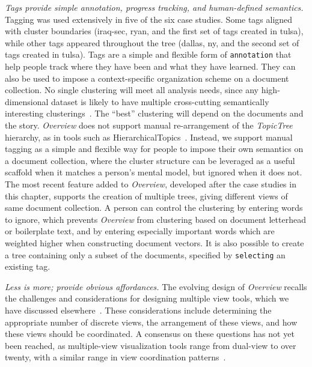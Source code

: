 {\it Tags provide simple annotation, progress tracking, and human-defined semantics.}
Tagging was used extensively in five of the six case studies. 
Some tags aligned with cluster boundaries ({\sc iraq-sec}, {\sc ryan}, and the first set of tags created in {\sc tulsa}), while other tags appeared throughout the tree ({\sc dallas}, {\sc ny}, and the second set of tags created in {\sc tulsa}).
Tags are a simple and flexible form of {\tt annotation} that help people track where they have been and what they have learned. 
They can also be used to impose a context-specific organization scheme on a document collection.
No single clustering will meet all analysis needs, since any high-dimensional dataset is likely to have multiple cross-cutting semantically interesting clusterings~\cite{Grimmer2011}. 
The ``best'' clustering will depend on the documents and the story.
{\it Overview} does not support manual re-arrangement of the {\it TopicTree} hierarchy, as in tools such as HierarchicalTopics~\cite{Dou2013}.
Instead, we support manual tagging as a simple and flexible way for people to impose their own semantics on a document collection, where the cluster structure can be leveraged as a useful scaffold when it matches a person's mental model, but ignored when it does not.
The most recent feature added to {\it Overview}, developed after the case studies in this chapter, supports the creation of multiple trees, giving different views of same document collection. 
A person can control the clustering by entering words to ignore, which prevents {\it Overview} from clustering based on document letterhead or boilerplate text, and by entering especially important words which are weighted higher when constructing document vectors. 
It is also possible to create a tree containing only a subset of the documents, specified by {\tt selecting} an existing tag.

{\it Less is more; provide obvious affordances.}
The evolving design of {\it Overview} recalls the challenges and considerations for designing multiple view tools, which we have discussed elsewhere~\cite{Lam2010}.
These considerations include determining the appropriate number of discrete views, the arrangement of these views, and how these views should be coordinated.
A consensus on these questions has not yet been reached, as multiple-view visualization tools range from dual-view to over twenty, with a similar range in view coordination patterns~\cite{Weaver2007}.

